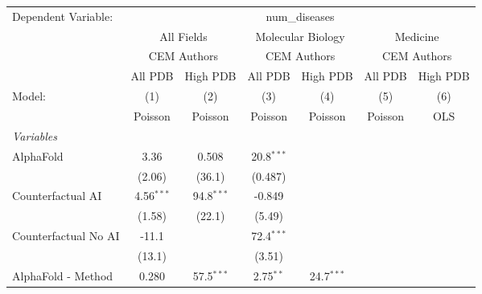 \begingroup
\centering
\begin{tabular}{lcccccc}
   \tabularnewline \midrule \midrule
   Dependent Variable: & \multicolumn{6}{c}{num\_diseases}\\
 & \multicolumn{2}{c}{All Fields} & \multicolumn{2}{c}{Molecular Biology} & \multicolumn{2}{c}{Medicine} \\
\cmidrule(lr){2-3} \cmidrule(lr){4-5} \cmidrule(lr){6-7}
 & \multicolumn{2}{c}{CEM Authors} & \multicolumn{2}{c}{CEM Authors} & \multicolumn{2}{c}{CEM Authors} \\
\cmidrule(lr){2-3} \cmidrule(lr){4-5} \cmidrule(lr){6-7}
 & \multicolumn{1}{c}{All PDB} & \multicolumn{1}{c}{High PDB} & \multicolumn{1}{c}{All PDB} & \multicolumn{1}{c}{High PDB} & \multicolumn{1}{c}{All PDB} & \multicolumn{1}{c}{High PDB} \\
\cmidrule(lr){2-2} \cmidrule(lr){3-3} \cmidrule(lr){4-4} \cmidrule(lr){5-5} \cmidrule(lr){6-6} \cmidrule(lr){7-7}
   Model:                                                  & (1)          & (2)          & (3)           & (4)          & (5)           & (6)\\  
                                                           &  Poisson     & Poisson      & Poisson       & Poisson      & Poisson       & OLS\\  
   \midrule
   \emph{Variables}\\
   AlphaFold                                               & 3.36         & 0.508        & 20.8$^{***}$  &              &               &   \\   
                                                           & (2.06)       & (36.1)       & (0.487)       &              &               &   \\   
   Counterfactual AI                                       & 4.56$^{***}$ & 94.8$^{***}$ & -0.849        &              &               &   \\   
                                                           & (1.58)       & (22.1)       & (5.49)        &              &               &   \\   
   Counterfactual No AI                                    & -11.1        &              & 72.4$^{***}$  &              &               &   \\   
                                                           & (13.1)       &              & (3.51)        &              &               &   \\   
   AlphaFold - Method                                      & 0.280        & 57.5$^{***}$ & 2.75$^{**}$   & 24.7$^{***}$ &               &   \\   

\end{tabular}
